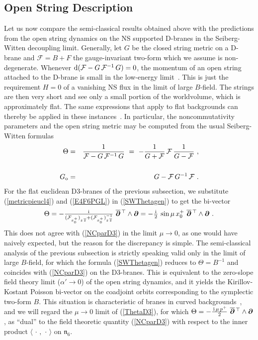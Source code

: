 \documentclass[11pt,a4paper]{article}
\newcommand{\ii}{{\rm i}}
\newcommand{\mbf}[1]{{\boldsymbol {#1} }}
\def\ii{{\,{\rm i}\,}}
\def\dd{{\rm d}}
\def\mdell{{\mbf\partial}}
\def\nn{\nonumber}
\def\bea{\begin{eqnarray}}
\def\eea{\end{eqnarray}}
\newcommand{\beq}{\begin{eqnarray}}
\newcommand{\eeq}{\end{eqnarray}}
\begin{document}
\subsection{Open String Description\label{D3OSD}}

Let us now compare the semi-classical results obtained above with the
predictions from the open string dynamics on the NS supported D-branes
in the Seiberg-Witten decoupling limit. Generally, let $G$ be the
closed string metric on a D-brane and $\mathcal{F}=B+F$ the
gauge-invariant two-form which we assume is non-degenerate. Whenever
$\dd(\mathcal{F}-G\,\mathcal{F}^{-1}\,G)=0$, the momentum of an open string
attached to the D-brane is small in the low-energy limit~\cite{HY1}.
This is just the requirement $H=0$ of a vanishing NS flux in the limit
of large $B$-field. The strings are then very short and see only a
small portion of the worldvolume, which is approximately flat. The
same expressions that apply to flat backgrounds can thereby be applied
in these instances~\cite{ARS1,HY1}. In particular, the
noncommutativity parameters and the open string metric may be computed
from the usual Seiberg-Witten formulas~\cite{SW1}
\bea
\Theta&=&\frac1{\mathcal{F}-G\,\mathcal{F}^{-1}\,G}~=~-\frac1{G+\mathcal{F}}
\,\mathcal{F}\,\frac1{G-\mathcal{F}} \ , \label{SWThetagen}
\\&&{~~~~}^{~~}_{~~}\nn\\
G_{\rm o}&=&G-\mathcal{F}\,G^{-1}\,\mathcal{F} \ .
\label{SWopenmetgen}\eea
For the flat euclidean D3-branes of the previous subsection, we
substitute (\ref{metricpieucl4}) and (\ref{E4F6PGL}) in
(\ref{SWThetagen}) to get the bi-vector
\beq
\Theta=-\mbox{$\frac\ii{(\mathcal{F}_{x_0^+})^{~}_{z\,\overline{z}}+
(\mathcal{F}_{x_0^+})^{-1}_{z\,\overline{z}}}$}~
\overline{\mdell}{}^{\,\top}\wedge\mdell=
-\mbox{$\frac\ii2$}\,\sin\mu\,x_0^+~\overline{\mdell}{}^{\,\top}
\wedge\mdell \ .
\label{ThetaD3}\eeq
This does not agree with (\ref{NCparD3}) in the limit $\mu\to0$, as
one would have naively expected, but the reason for the discrepancy is
simple. The semi-classical analysis of the previous subsection is
strictly speaking valid only in the limit of large $B$-field, for
which the formula (\ref{SWThetagen}) reduces to $\Theta=B^{-1}$ and
coincides with (\ref{NCparD3}) on the D3-branes. This is equivalent to
the zero-slope field theory limit ($\alpha'\to0$) of the open string
dynamics, and it yields the Kirillov-Kostant Poisson bi-vector on the
coadjoint orbits corresponding to the symplectic two-form $B$. This
situation is characteristic of branes in curved
backgrounds~\cite{ARS1,HY1}, and we will regard the $\mu\to0$ limit of
(\ref{ThetaD3}), for which
$\Theta=-\frac{\ii\mu\,p^+}2~\overline{\mdell}{}^{\,\top}\wedge\mdell$,
as ``dual'' to the field theoretic quantity (\ref{NCparD3}) with
respect to the inner product $\langle\,\cdot\,,\,\cdot\,\rangle$ on
$\mathfrak{n}_6$.
\end{document}
